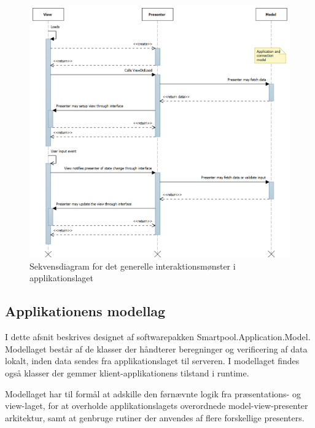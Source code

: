 \begin{figure}
	\centering
	\includegraphics[width=1.0\linewidth]{figs/design/application_sd}
	\caption{Sekvensdiagram for det generelle interaktionsmønster i applikationslaget}
	\label{fig:application_sd}
\end{figure}

\subsection{Applikationens modellag}
I dette afsnit beskrives designet af softwarepakken Smartpool.Application.Model. Modellaget består af de klasser der håndterer beregninger og verificering af data lokalt, inden data sendes fra applikationslaget til serveren. I modellaget findes også klasser der gemmer klient-applikationens tilstand i runtime.

Modellaget har til formål at adskille den førnævnte logik fra præsentations- og view-laget, for at overholde applikationslagets overordnede model-view-presenter arkitektur, samt at genbruge rutiner der anvendes af flere forskellige presenters.

